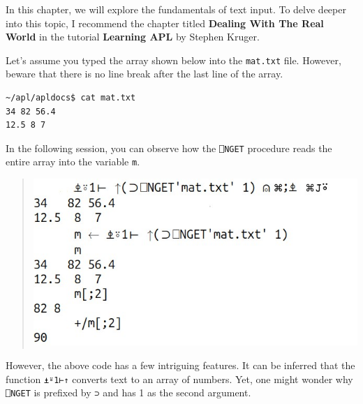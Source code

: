 \documentclass[a4paper,12pt]{book}
\begin{document}
In this chapter, we will explore the fundamentals
of text input. To delve deeper into this
topic, I recommend the chapter
titled \textbf{Dealing With The Real World} in
the tutorial \textbf{Learning APL} by Stephen Kruger.

Let's assume you typed the array shown below
into the \verb|mat.txt| file. However, beware
that there is no line break after the last
line of the array.
\begin{verbatim}
~/apl/apldocs$ cat mat.txt 
34 82 56.4
12.5 8 7
\end{verbatim}

In the following session, you can observe
how the \verb|⎕NGET| procedure reads the
entire array into the variable \verb|m|.
\begin{quote}
\includegraphics{srcfigs/nget.jpg}
\end{quote}
However, the above code has a few intriguing
features. It can be inferred that the
function \verb|⍎⍤1⊢↑| converts text to an
array of numbers. Yet, one might wonder
why \verb|⎕NGET| is prefixed by \verb|⊃| and
has 1 as the second argument.
\end{document}
